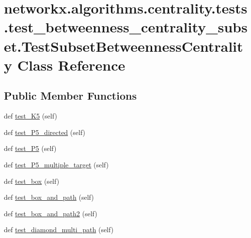 \hypertarget{classnetworkx_1_1algorithms_1_1centrality_1_1tests_1_1test__betweenness__centrality__subset_1_1TestSubsetBetweennessCentrality}{}\section{networkx.\+algorithms.\+centrality.\+tests.\+test\+\_\+betweenness\+\_\+centrality\+\_\+subset.\+Test\+Subset\+Betweenness\+Centrality Class Reference}
\label{classnetworkx_1_1algorithms_1_1centrality_1_1tests_1_1test__betweenness__centrality__subset_1_1TestSubsetBetweennessCentrality}
\subsection*{Public Member Functions}
\begin{DoxyCompactItemize}
\item 
def \hyperlink{classnetworkx_1_1algorithms_1_1centrality_1_1tests_1_1test__betweenness__centrality__subset_1_1TestSubsetBetweennessCentrality_a9fa001741d51951495744530cba82bda}{test\+\_\+\+K5} (self)
\item 
def \hyperlink{classnetworkx_1_1algorithms_1_1centrality_1_1tests_1_1test__betweenness__centrality__subset_1_1TestSubsetBetweennessCentrality_ac6abe7589059c698da81a4b3ef240d2c}{test\+\_\+\+P5\+\_\+directed} (self)
\item 
def \hyperlink{classnetworkx_1_1algorithms_1_1centrality_1_1tests_1_1test__betweenness__centrality__subset_1_1TestSubsetBetweennessCentrality_ade90c20057df28483a21661603d52c3e}{test\+\_\+\+P5} (self)
\item 
def \hyperlink{classnetworkx_1_1algorithms_1_1centrality_1_1tests_1_1test__betweenness__centrality__subset_1_1TestSubsetBetweennessCentrality_a9820a80d51e690c6df8da163209df4f0}{test\+\_\+\+P5\+\_\+multiple\+\_\+target} (self)
\item 
def \hyperlink{classnetworkx_1_1algorithms_1_1centrality_1_1tests_1_1test__betweenness__centrality__subset_1_1TestSubsetBetweennessCentrality_a507127cb77d907a609c0a21c74fd85f5}{test\+\_\+box} (self)
\item 
def \hyperlink{classnetworkx_1_1algorithms_1_1centrality_1_1tests_1_1test__betweenness__centrality__subset_1_1TestSubsetBetweennessCentrality_a15f4d6a138d535816eefc2e045dfbff0}{test\+\_\+box\+\_\+and\+\_\+path} (self)
\item 
def \hyperlink{classnetworkx_1_1algorithms_1_1centrality_1_1tests_1_1test__betweenness__centrality__subset_1_1TestSubsetBetweennessCentrality_ab2ea0df54d012d3b0854585e56b99d04}{test\+\_\+box\+\_\+and\+\_\+path2} (self)
\item 
def \hyperlink{classnetworkx_1_1algorithms_1_1centrality_1_1tests_1_1test__betweenness__centrality__subset_1_1TestSubsetBetweennessCentrality_a166ae9362c472658f45bda7ad9b1f0d0}{test\+\_\+diamond\+\_\+multi\+\_\+path} (self)
\end{DoxyCompactItemize}


